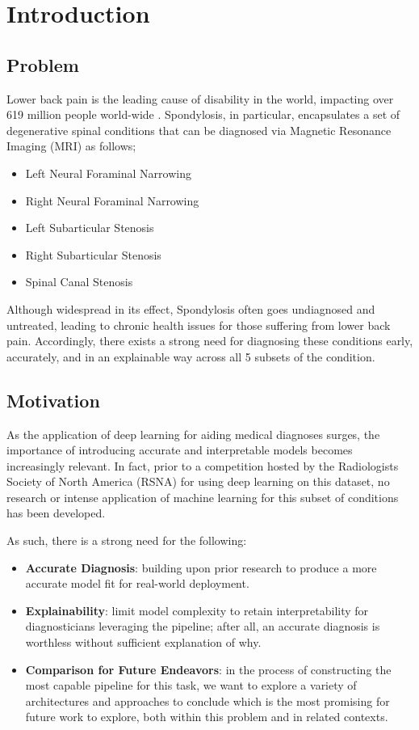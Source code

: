 \documentclass[conference]{IEEEtran}
\begin{document}
\section{Introduction}
\subsection{Problem}
Lower back pain is the leading cause of disability in the world, impacting over 619 million people world-wide \cite{WHO}. Spondylosis, in particular, encapsulates a set of degenerative spinal conditions that can be diagnosed via Magnetic Resonance Imaging (MRI) as follows;
\begin{itemize}
    \item Left Neural Foraminal Narrowing
    \item Right Neural Foraminal Narrowing
    \item Left Subarticular Stenosis
    \item Right Subarticular Stenosis
    \item Spinal Canal Stenosis
\end{itemize}

Although widespread in its effect, Spondylosis often goes undiagnosed and untreated, leading to chronic health issues for those suffering from lower back pain. Accordingly, there exists a strong need for diagnosing these conditions early, accurately, and in an explainable way across all 5 subsets of the condition.

\subsection{Motivation}
As the application of deep learning for aiding medical diagnoses surges, the importance of introducing accurate and interpretable models becomes increasingly relevant. In fact, prior to a competition hosted by the Radiologists Society of North America (RSNA) for using deep learning on this dataset, no research or intense application of machine learning for this subset of conditions has been developed.

As such, there is a strong need for the following:
\begin{itemize}
    \item \textbf{Accurate Diagnosis}: building upon prior research to produce a more accurate model fit for real-world deployment.
    
    \item \textbf{Explainability}: limit model complexity to retain interpretability for diagnosticians leveraging the pipeline; after all, an accurate diagnosis is worthless without sufficient explanation of why.

    \item \textbf{Comparison for Future Endeavors}: in the process of constructing the most capable pipeline for this task, we want to explore a variety of architectures and approaches to conclude which is the most promising for future work to explore, both within this problem and in related contexts.
\end{itemize}
\end{document}
